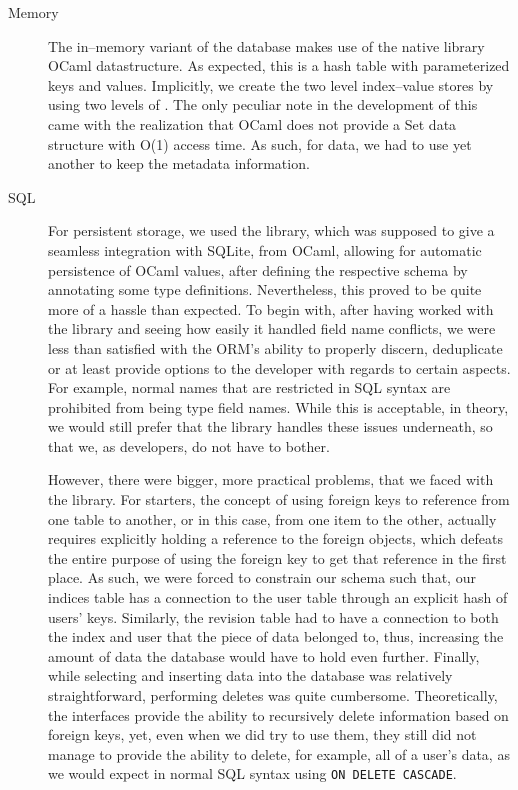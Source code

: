 \begin{description}
  \item[Memory]
  The in--memory variant of the database makes use of the native library OCaml  datastructure.
  As expected, this is a hash table with parameterized keys and values.
  Implicitly, we create the two level index--value stores by using two levels of .
  The only peculiar note in the development of this came with the realization that OCaml does not provide a Set data structure with O(1) access time.
  As such, for  data, we had to use yet another  to keep the metadata information.

  \item[SQL]
  For persistent storage, we used the  library, which was supposed to give a seamless integration with SQLite, from OCaml, allowing for automatic persistence of OCaml values, after defining the respective schema by annotating some type definitions.
  Nevertheless, this proved to be quite more of a hassle than expected.
  To begin with, after having worked with the  library and seeing how easily it handled field name conflicts, we were less than satisfied with the ORM's ability to properly discern, deduplicate or at least provide options to the developer with regards to certain aspects.
  For example, normal names that are restricted in SQL syntax are prohibited from being type field names.
  While this is acceptable, in theory, we would still prefer that the library handles these issues underneath, so that we, as developers, do not have to bother.

  However, there were bigger, more practical problems, that we faced with the library.
  For starters, the concept of using foreign keys to reference from one table to another, or in this case, from one item to the other, actually requires explicitly holding a reference to the foreign objects, which defeats the entire purpose of using the foreign key to get that reference in the first place.
  As such, we were forced to constrain our schema such that, our indices table has a connection to the user table through an explicit hash of users' keys.
  Similarly, the revision table had to have a connection to both the index and user that the piece of data belonged to, thus, increasing the amount of data the database would have to hold even further.
  Finally, while selecting and inserting data into the database was relatively straightforward, performing deletes was quite cumbersome.
  Theoretically, the interfaces provide the ability to recursively delete information based on foreign keys, yet, even when we did try to use them, they still did not manage to provide the ability to delete, for example, all of a user's data, as we would expect in normal SQL syntax using \texttt{ON DELETE CASCADE}.
\end{description}

